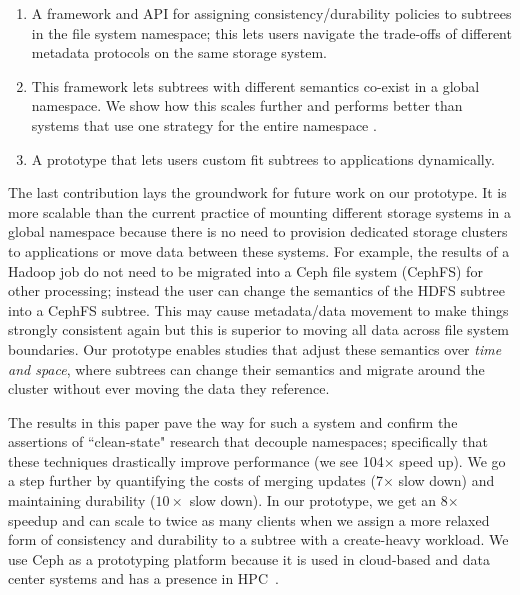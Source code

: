 \begin{enumerate}

  \item A framework and API for assigning consistency/durability policies 
  to subtrees in the file system namespace; this lets users navigate
  the trade-offs of different metadata protocols on the same storage system.

  \item This framework lets subtrees with different semantics co-exist in a
  global namespace. We show how this scales further and performs better than
  systems that use one strategy for the entire namespace .

  \item A prototype that lets users custom fit subtrees to applications
  dynamically. 

\end{enumerate}

The last contribution lays the groundwork for future work on our prototype. It
is more scalable than the current practice of mounting different storage systems in a global
namespace because there is no need to provision dedicated storage clusters to
applications or move data between these systems.  For example, the results of a
Hadoop job do not need to be migrated into a Ceph file system (CephFS) for other processing; instead
the user can change the semantics of the HDFS subtree into a CephFS subtree.
This may cause metadata/data movement to make things strongly consistent again
but this is superior to moving all data across file system boundaries. Our prototype
enables studies that adjust these semantics over {\it time and space}, where
subtrees can change their semantics and migrate around the cluster without ever
moving the data they reference.

The results in this paper pave the way for such a system and confirm the
assertions of ``clean-state" research that decouple namespaces; specifically
that these techniques drastically improve performance (we see 104\(\times\) speed up).
We go a step further by quantifying the costs of merging updates (7\(\times\)
slow down) and maintaining durability (\(10\times\) slow down). In our
prototype, we get an 8\(\times\) speedup and can scale to twice as many clients
when we assign a more relaxed form of consistency and durability to a subtree
with a create-heavy workload.  We use Ceph as a prototyping platform because it
is used in cloud-based and data center systems and has a presence in
HPC~\cite{wang:pdsw13-ceph-hpc}. 


